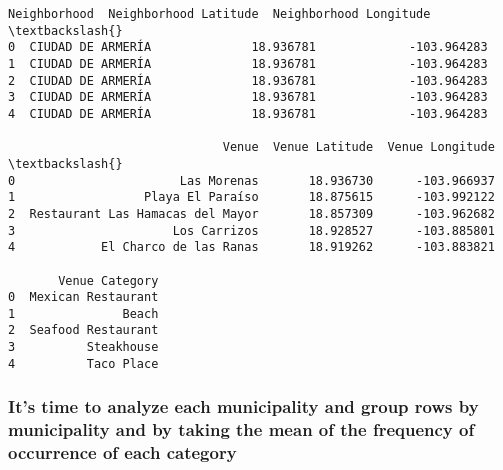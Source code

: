 \documentclass[11pt]{article}
\makeatletter
\newcommand{\boxspacing}{\kern\kvtcb@left@rule\kern\kvtcb@boxsep}
\newcommand{\prompt}[4]{
        \ttfamily\llap{{\color{#2}[#3]:\hspace{3pt}#4}}\vspace{-\baselineskip}
    }
\makeatother
\begin{document}
            \begin{tcolorbox}[breakable, size=fbox, boxrule=.5pt, pad at break*=1mm, opacityfill=0]
\prompt{Out}{outcolor}{28}{\boxspacing}
\begin{Verbatim}[commandchars=\\\{\}]
        Neighborhood  Neighborhood Latitude  Neighborhood Longitude  \textbackslash{}
0  CIUDAD DE ARMERÍA              18.936781             -103.964283
1  CIUDAD DE ARMERÍA              18.936781             -103.964283
2  CIUDAD DE ARMERÍA              18.936781             -103.964283
3  CIUDAD DE ARMERÍA              18.936781             -103.964283
4  CIUDAD DE ARMERÍA              18.936781             -103.964283

                              Venue  Venue Latitude  Venue Longitude  \textbackslash{}
0                       Las Morenas       18.936730      -103.966937
1                  Playa El Paraíso       18.875615      -103.992122
2  Restaurant Las Hamacas del Mayor       18.857309      -103.962682
3                      Los Carrizos       18.928527      -103.885801
4            El Charco de las Ranas       18.919262      -103.883821

       Venue Category
0  Mexican Restaurant
1               Beach
2  Seafood Restaurant
3          Steakhouse
4          Taco Place
\end{Verbatim}
\end{tcolorbox}
        
    \hypertarget{its-time-to-analyze-each-municipality-and-group-rows-by-municipality-and-by-taking-the-mean-of-the-frequency-of-occurrence-of-each-category}{%
\subsubsection{It's time to analyze each municipality and group rows by
municipality and by taking the mean of the frequency of occurrence of
each
category}\label{its-time-to-analyze-each-municipality-and-group-rows-by-municipality-and-by-taking-the-mean-of-the-frequency-of-occurrence-of-each-category}}
\end{document}
